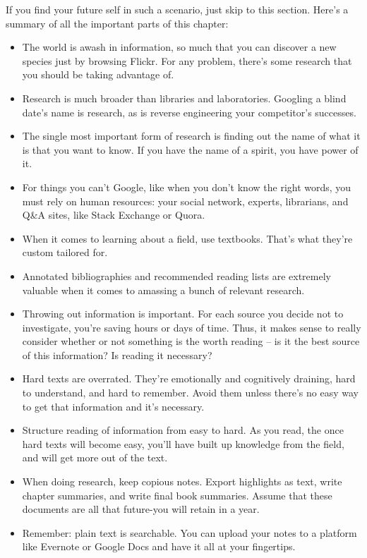 If you find your future self in such a scenario, just skip to this
section. Here's a summary of all the important parts of this chapter:

\begin{itemize}
\item The world is awash in information, so much that you can discover a new species
just by browsing Flickr. For any problem, there's some research that you should
be taking advantage of.

\item Research is much broader than libraries and laboratories. Googling a blind
date's name is research, as is reverse engineering your competitor's successes.

\item The single most important form of research is finding out the name of what it
is that you want to know. If you have the name of a spirit, you have power of
it.

\item For things you can't Google, like when you don't know the right words, you
must rely on human resources: your social network, experts, librarians, and Q\&A
sites, like Stack Exchange or Quora.

\item When it comes to learning about a field, use textbooks. That's what they're
custom tailored for.

\item Annotated bibliographies and recommended reading lists are extremely valuable
when it comes to amassing a bunch of relevant research.

\item Throwing out information is important. For each source you decide not to
investigate, you're saving hours or days of time. Thus, it makes sense to really
consider whether or not something is the worth reading -- is it the best source
of this information? Is reading it necessary?

\item Hard texts are overrated. They're emotionally and cognitively draining, hard to
understand, and hard to remember. Avoid them unless there's no easy way to get
that information and it's necessary.

\item Structure reading of information from easy to hard. As you read, the once hard
texts will become easy, you'll have built up knowledge from the field, and will
get more out of the text.

\item When doing research, keep copious notes. Export highlights as text, write
chapter summaries, and write final book summaries. Assume that these documents
are all that future-you will retain in a year.

\item Remember: plain text is searchable. You can upload your notes to a platform
like Evernote or Google Docs and have it all at your fingertips.
\end{itemize}

